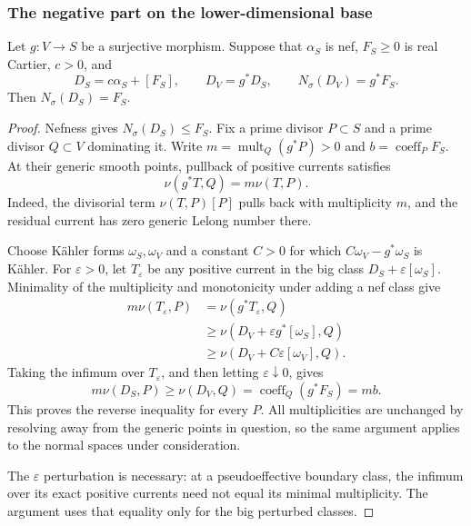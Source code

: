 \subsubsection{The negative part on the lower-dimensional base}

\begin{lemma}
\label{repair:lem:negative-part-base}
Let $g:V\to S$ be a surjective morphism. Suppose that $\alpha_S$ is nef,
$F_S\geq0$ is real Cartier, $c>0$, and
\[
 D_S=c\alpha_S+[F_S],\qquad D_V=g^*D_S,\qquad
 N_\sigma(D_V)=g^*F_S.
\]
Then $N_\sigma(D_S)=F_S$.
\end{lemma}

\begin{proof}
Nefness gives $N_\sigma(D_S)\leq F_S$. Fix a prime divisor $P\subset S$
and a prime divisor $Q\subset V$ dominating it. Write
$m=\operatorname{mult}_Q(g^*P)>0$ and $b=\operatorname{coeff}_P F_S$.
At their generic smooth points, pullback of positive currents satisfies
\[
                         \nu(g^*T,Q)=m\nu(T,P).
\]
Indeed, the divisorial term $\nu(T,P)[P]$ pulls back with multiplicity
$m$, and the residual current has zero generic Lelong number there.

Choose K\"ahler forms $\omega_S,\omega_V$ and a constant $C>0$ for which
$C\omega_V-g^*\omega_S$ is K\"ahler. For $\varepsilon>0$, let $T_\varepsilon$
be any positive current in the big class $D_S+\varepsilon[\omega_S]$.
Minimality of the multiplicity and monotonicity under adding a nef
class give
\begin{align*}
 m\nu(T_\varepsilon,P)
 &=\nu(g^*T_\varepsilon,Q)\\
 &\geq\nu(D_V+\varepsilon g^*[\omega_S],Q)\\
 &\geq\nu(D_V+C\varepsilon[\omega_V],Q).
\end{align*}
Taking the infimum over $T_\varepsilon$, and then letting
$\varepsilon\downarrow0$, gives
\[
 m\nu(D_S,P)\geq\nu(D_V,Q)
                 =\operatorname{coeff}_Q(g^*F_S)=mb.
\]
This proves the reverse inequality for every $P$.
All multiplicities are unchanged by resolving away from the generic
points in question, so the same argument applies to the normal spaces
under consideration.

The $\varepsilon$ perturbation is necessary: at a pseudoeffective
boundary class, the infimum over its exact positive currents need not
equal its minimal multiplicity. The argument uses that equality only
for the big perturbed classes.
\end{proof}

